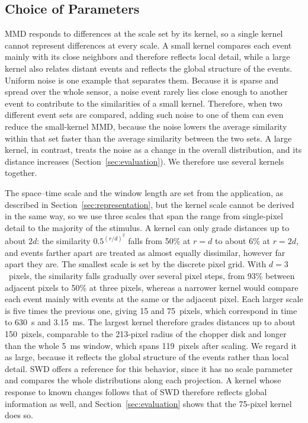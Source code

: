 \subsection{Choice of Parameters}
\label{sec:parameters}

MMD responds to differences at the scale set by its kernel, so a single kernel cannot represent differences at every scale. A small kernel compares each event mainly with its close neighbors and therefore reflects local detail, while a large kernel also relates distant events and reflects the global structure of the events. Uniform noise is one example that separates them. Because it is sparse and spread over the whole sensor, a noise event rarely lies close enough to another event to contribute to the similarities of a small kernel. Therefore, when two different event sets are compared, adding such noise to one of them can even reduce the small-kernel MMD, because the noise lowers the average similarity within that set faster than the average similarity between the two sets. A large kernel, in contrast, treats the noise as a change in the overall distribution, and its distance increases (Section~\ref{sec:evaluation}). We therefore use several kernels together.

The space--time scale and the window length are set from the application, as described in Section~\ref{sec:representation}, but the kernel scale cannot be derived in the same way, so we use three scales that span the range from single-pixel detail to the majority of the stimulus. A kernel can only grade distances up to about $2d$: the similarity $0.5^{(r/d)^2}$ falls from 50\% at $r = d$ to about 6\% at $r = 2d$, and events farther apart are treated as almost equally dissimilar, however far apart they are. The smallest scale is set by the discrete pixel grid. With $d = 3$~pixels, the similarity falls gradually over several pixel steps, from 93\% between adjacent pixels to 50\% at three pixels, whereas a narrower kernel would compare each event mainly with events at the same or the adjacent pixel. Each larger scale is five times the previous one, giving 15 and 75~pixels, which correspond in time to 630~\textmu s and 3.15~ms. The largest kernel therefore grades distances up to about 150~pixels, comparable to the 213-pixel radius of the chopper disk and longer than the whole 5~ms window, which spans 119~pixels after scaling. We regard it as large, because it reflects the global structure of the events rather than local detail. SWD offers a reference for this behavior, since it has no scale parameter and compares the whole distributions along each projection. A kernel whose response to known changes follows that of SWD therefore reflects global information as well, and Section~\ref{sec:evaluation} shows that the 75-pixel kernel does so.

